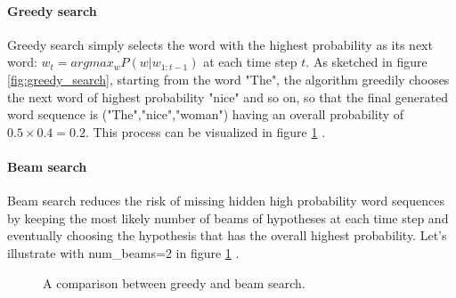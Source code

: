 \paragraph{Greedy search} Greedy search simply selects the word with the highest probability as its next word: $w_t = argmax_{w}P(w | w_{1:t-1})$ at each time step $t$. As sketched in figure \ref{fig:greedy_search}, starting from the word "The", the algorithm greedily chooses the next word of highest probability "nice" and so on, so that the final generated word sequence is ("The","nice","woman") having an overall probability of $0.5 \times 0.4=0.2$. This process can be visualized in figure \ref{fig:greedy_beam_search} .

\paragraph{Beam search} Beam search reduces the risk of missing hidden high probability word sequences by keeping the most likely number of beams of hypotheses at each time step and eventually choosing the hypothesis that has the overall highest probability. Let's illustrate with num\_beams=2 in figure \ref{fig:greedy_beam_search} .

\begin{figure}[H]
\centering
{} \qquad
{}
\caption{A comparison between greedy and beam search. \label{fig:greedy_beam_search}}
\end{figure}

